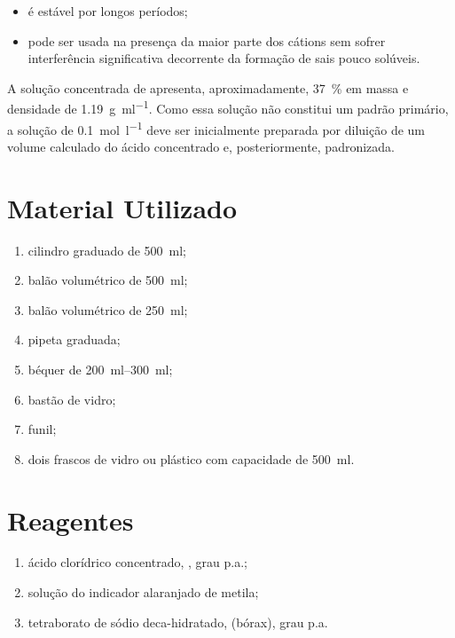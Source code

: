 \documentclass[a4paper,12pt]{article}
\begin{document}
\begin{itemize}
    \item é estável por longos períodos;
    \item pode ser usada na presença da maior parte dos cátions sem sofrer interferência significativa decorrente da formação de sais pouco solúveis.
\end{itemize}

A solução concentrada de  apresenta, aproximadamente, \qty{37}{\percent} em massa e densidade de \qty{1.19}{\gram\per\milli\litre}. Como essa solução não constitui um padrão primário, a solução de  \qty{0.1}{\mole\per\litre} deve ser inicialmente preparada por diluição de um volume calculado do ácido concentrado e, posteriormente, padronizada.

\section{Material Utilizado}

\begin{enumerate}[label=\alph*.]
    \item cilindro graduado de \qty{500}{\milli\litre};
    \item balão volumétrico de \qty{500}{\milli\litre};
    \item balão volumétrico de \qty{250}{\milli\litre};
    \item pipeta graduada;
    \item béquer de \qtyrange{200}{300}{\milli\litre};
    \item bastão de vidro;
    \item funil;
    \item dois frascos de vidro ou plástico com capacidade de \qty{500}{\milli\litre}.
\end{enumerate}

\section{Reagentes}

\begin{enumerate}[label=\alph*.]
    \item ácido clorídrico concentrado, , grau p.a.;
    \item solução do indicador alaranjado de metila;
    \item tetraborato de sódio deca-hidratado,  (bórax), grau p.a.
\end{enumerate}
\end{document}
